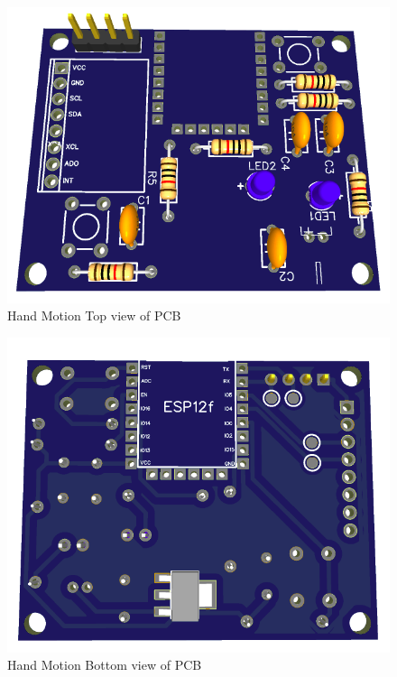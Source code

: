 \begin{figure}[H]
    \centering
    \includegraphics[scale=0.5]{Figures/HMpcb_top.png}
    \caption{Hand Motion Top view of PCB}
    \label{fig:handmotiontopview}
\end{figure}


\begin{figure}[H]
    \centering
    \includegraphics[scale=0.5]{Figures/HMpcb_bottom.png}
    \caption{Hand Motion Bottom view of PCB}
    \label{fig:handmotionbottomview}
\end{figure}


